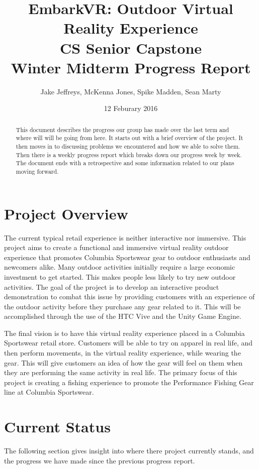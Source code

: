 \documentclass[10pt,journal,compsoc,onecolumn, draftclsnofoot]{IEEEtran}
\title{
EmbarkVR: Outdoor Virtual Reality Experience \\
CS Senior Capstone \\
Winter Midterm Progress Report\\
\vspace{1mm}
}
\author{Jake Jeffreys, McKenna Jones, Spike Madden, Sean Marty}
\date{12 Feburary 2016}
\begin{document}
\begin{titlepage}
\maketitle
\vspace{1mm}
\begin{abstract}
This document describes the progress our group has made over the last term and where will will be going from here. It starts out with a brief overview of the project. It then moves in to discussing problems we encountered and how we able to solve them. Then there is a weekly progress report which breaks down our progress week by week. The document ends with a retrospective and some information related to our plans moving forward.
\end{abstract}
\vspace{1cm}
\end{titlepage}
\tableofcontents
\clearpage

\section{Project Overview}
The current typical retail experience is neither interactive nor immersive.
This project aims to create a functional and immersive virtual reality outdoor experience that promotes Columbia Sportswear gear to outdoor enthusiasts and newcomers alike.
Many outdoor activities initially require a large economic investment to get started.
This makes people less likely to try new outdoor activities.
The goal of the project is to develop an interactive product demonstration to combat this issue by providing customers with an experience of the outdoor activity before they purchase any gear related to it.
This will be accomplished through the use of the HTC Vive and the Unity Game Engine.

The final vision is to have this virtual reality experience placed in a Columbia Sportswear retail store.
Customers will be able to try on apparel in real life, and then perform movements, in the virtual reality experience, while wearing the gear.
This will give customers an idea of how the gear will feel on them when they are performing the same activity in real life.
The primary focus of this project is creating a fishing experience to promote the Performance Fishing Gear line at Columbia Sportswear.

\section{Current Status}
The following section gives insight into where there project currently stands, and the progress we have made since the previous progress report.
\end{document}
